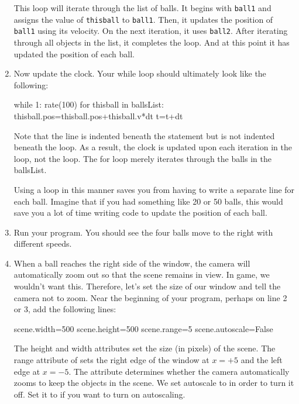 \begin{enumerate}
This loop will iterate through the list of balls. It begins with \texttt{ball1} and assigns the value of \texttt{thisball} to \texttt{ball1}. Then, it updates the position of \texttt{ball1} using its velocity. On the next iteration, it uses \texttt{ball2}. After iterating through all objects in the list, it completes the loop. And at this point it has updated the position of each ball.

\item Now update the clock. Your while loop  should ultimately look like the following:

\begin{myvpython}
while 1:
    rate(100)
    for thisball in ballsList:
        thisball.pos=thisball.pos+thisball.v*dt    
    t=t+dt
\end{myvpython}

Note that the line  is indented beneath the  statement but is not indented  beneath the  loop. As a result, the clock is updated upon each iteration in the  loop, not the  loop. The for loop merely iterates through the balls in the ballsList.

Using a  loop in this manner saves you from having to write a separate line for each ball. Imagine that if you had something like 20 or 50 balls, this would save you a lot of time writing code to update the position of each ball.

\item Run your program. You should see the four balls move to the right with different speeds.

\item When a ball reaches the right side of the window, the camera will automatically zoom out so that the scene remains in view. In game, we wouldn't want this. Therefore, let's set the size of our window and tell the camera not to zoom. Near the beginning of your program, perhaps on line 2 or 3, add the following lines:

\begin{myvpython}
scene.width=500
scene.height=500
scene.range=5
scene.autoscale=False
\end{myvpython}

The height and width attributes set the size (in pixels) of the scene. The range attribute of  sets the right edge of the window at $x=+5$ and the left edge at $x=-5$. The  attribute determines whether the camera automatically zooms to keep the objects in the scene. We set autoscale to  in order to turn it off. Set it to  if you want to turn on autoscaling.


\end{enumerate}
